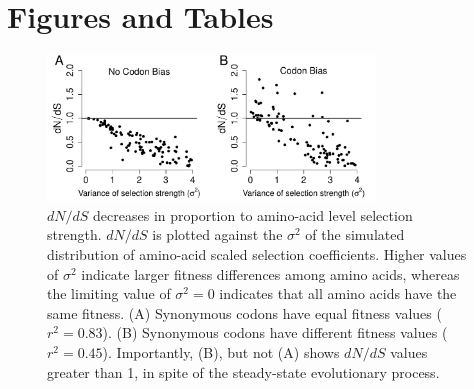 \documentclass[11pt]{article}
\begin{document}
		

		
		


		
		
	
	
\section*{Figures and Tables}

\vspace{2cm}
	
\begin{figure}[htbp]
	\centerline{\includegraphics[width=8.7cm]{figures/MainText/dnds_variance.pdf}}
	\caption{\label{dnds_variance} $dN/dS$ decreases in proportion to amino-acid level selection strength. $dN/dS$ is plotted against the $\sigma^2 $ of the simulated distribution of amino-acid scaled selection coefficients. Higher values of $\sigma^2$ indicate larger fitness differences among amino acids, whereas the limiting value of $\sigma^2 = 0$ indicates that all amino acids have the same fitness. (A) Synonymous codons have equal fitness values ($r^2=0.83$). (B) Synonymous codons have different fitness values ($r^2=0.45$). Importantly, (B), but not (A) shows $dN/dS$ values greater than 1, in spite of the steady-state evolutionary process.}
\end{figure}
		
		
\vspace{2cm}
		
\end{document}
